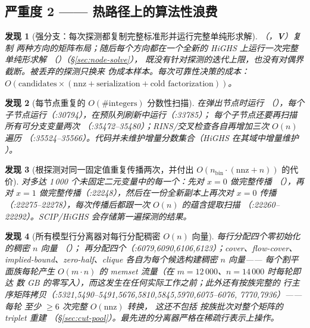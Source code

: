\documentclass[11pt]{ctexart}
\newtheorem{finding}{发现}
\newcommand{\nnz}{\mathrm{nnz}}
\begin{document}
\subsection{严重度 2 —— 热路径上的算法性浪费}

\begin{finding}[强分支：每次探测都复制完整标准形并运行完整单纯形求解]
（，\textbf{V}）复制
两种方向的矩阵布局；随后每个方向都在一个全新的 HiGHS 上运行一次完整单纯形求解
（）（\S\ref{sec:node-solve}），
既没有针对探测的迭代上限，也没有对偶界截断。被丢弃的探测只换来
伪成本样本。每次可靠性决策的成本：$O(\text{candidates} \times
(\nnz + \text{serialization} + \text{cold factorization}))$。
\end{finding}

\begin{finding}[每节点重复的 $O(\#\mathrm{integers})$ 分数性扫描]
 在弹出节点时运行
（），每个子节点运行（:30794），在预队列刷新中运行（:33785）；
 每个子节点还要再扫描所有可分支变量两次
（:35472--35480）；RINS/交叉检查各自再增加三次 $O(n)$ 遍历
（:35524--35566）。代码并未维护增量分数集合（HiGHS 在其域中增量维护
）。
\end{finding}

\begin{finding}[根探测对同一固定值重复传播两次，并付出 $O(n_{\mathrm{bin}} \cdot (\nnz + n))$ 的代价]
对多达 1\,000 个未固定二元变量中的每一个：先对 $x{=}0$ 做完整传播
（），再对 $x{=}1$ 做完整传播（:22248），\emph{然后在一份全新副本上再次对 $x{=}0$ 传播}
（:22275--22278），每次传播后都跟一次 $O(n)$ 的蕴含提取扫描
（:22260--22292）。SCIP/HiGHS 会存储第一遍探测的结果。
\end{finding}

\begin{finding}[所有模型行分离器对每行分配稠密 $O(n)$ 向量]
 \emph{每行}分配四个零初始化的稠密 $n$ 向量
（）；
 再分配四个（:6079,6090,6106,6123）；cover、flow-cover、
implied-bound、zero-half、clique 各自为每个候选构建稠密 $n$ 向量——
每个割平面族每轮产生 $O(m \cdot n)$ 的 memset 流量（在 $m=12\,000$、$n=14\,000$ 时每轮即达
数 GB 的零写入），而这发生在任何实际工作之前；此外还有按族完整的
行主序矩阵拷贝（:5321,5490--5491,5676,5810,5845,5970,6075--6076,
7770,7936）——每轮  至少 $\ge 6$ 次完整 $O(\nnz)$ 转换，
这还不包括  按族批次对整个矩阵的 triplet 重建
（\S\ref{sec:cut-pool}）。最先进的分离器严格在稀疏行表示上操作。
\end{finding}
\end{document}
